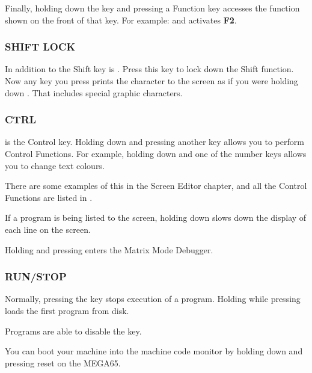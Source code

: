 Finally, holding down the  key and pressing a Function key accesses the function shown on the front of that key. For example:  and  activates \textbf{F2}.


\subsubsection{SHIFT LOCK}

In addition to the Shift key is . Press this key to lock down the Shift function. Now any key you press prints the character to the screen as if you were holding down . That includes special graphic characters.

\subsubsection{CTRL}

 is the Control key. Holding down  and pressing another key allows you to perform Control Functions. For example, holding down  and one of the number keys allows you to change text colours.

There are some examples of this in the Screen Editor chapter, and all the Control Functions are listed in .

If a program is being listed to the screen, holding down  slows down the display of each line on the screen.

Holding  and pressing \megakey{*} enters the Matrix Mode Debugger.

\subsubsection{RUN/STOP}

Normally, pressing the  key stops execution of a program. Holding  while pressing  loads the first program from disk.

Programs are able to disable the  key.

You can boot your machine into the machine code monitor by holding down  and pressing reset on the MEGA65.

